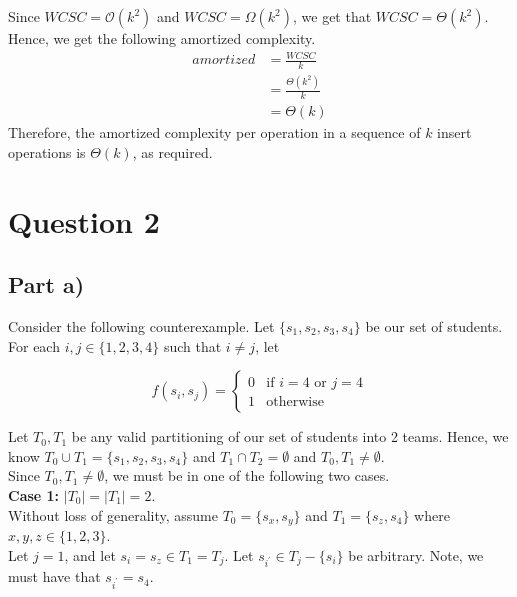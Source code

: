 \documentclass[12pt]{article}
\begin{document}
Since $WCSC = \mathcal{O}(k^2)$ and $WCSC = \Omega(k^2)$, we get that $WCSC = \Theta(k^2)$. \\

Hence, we get the following amortized complexity. 
\begin{align*}
amortized &= \frac{WCSC}{k} \\
&= \frac{\Theta(k^2)}{k} \\
&= \Theta(k)
\end{align*}
Therefore, the amortized complexity per operation in a sequence of $k$ insert operations is $\Theta(k)$, as required. 


\newpage

\section*{Question 2}

\subsection*{Part a)}

Consider the following counterexample. Let $\{s_1,s_2,s_3,s_4\}$ be our set of students. \\

For each $i,j \in \{1,2,3,4\}$ such that $i \neq j$, let

\[
    f(s_i,s_j) = 
    \begin{cases} 
        0 &\text{if $i = 4$ or $j = 4$} \\
        1 &\text{otherwise}
    \end{cases}
\]

Let $T_0,T_1$ be any valid partitioning of our set of students into 2 teams. Hence, we know $T_0 \cup T_1 = \{s_1,s_2,s_3,s_4\}$ and $T_1 \cap T_2 = \emptyset$ and $T_0, T_1 \neq \emptyset$. \\

Since $T_0, T_1 \neq \emptyset$, we must be in one of the following two cases. \\

\textbf{Case 1:} $|T_0| = |T_1| = 2$. \\

Without loss of generality, assume $T_0 = \{s_x,s_y\}$ and $T_1 = \{s_z, s_4\}$ where $x,y,z \in \{1,2,3\}$. \\

Let $j = 1$, and let $s_i = s_z \in T_1 = T_j$. Let $s_{i^\prime} \in T_j - \{s_i\}$ be arbitrary. Note, we must have that $s_{i^\prime} = s_4$. \\
\end{document}
